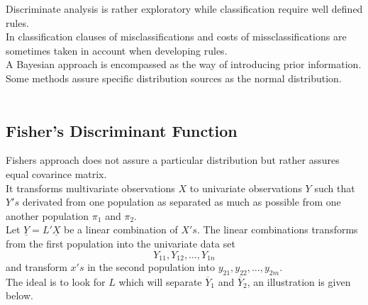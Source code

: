 \documentclass[11pt,a4paper]{article}
\theoremstyle{definition}
\begin{document}
Discriminate analysis is rather exploratory while classification require well defined rules.\\

In classification clauses of misclassifications and costs of missclassifications are sometimes taken in account when developing rules.\\
A Bayesian approach is encompassed as the way of introducing prior information.\\

Some methods assure specific distribution sources as the normal distribution.\\\\








\subsection{Fisher's Discriminant Function}
Fishers approach does not assure a particular distribution but rather assures equal covarince matrix.\\

It transforms multivariate observations $X$ to univariate observations $Y$ such that $Y's$ derivated from one population as separated as much as possible from one another population $\pi_1$ and $\pi_2$.\\

Let $\underline{Y}= L'\underline{X}$ be a linear combination of $X's$. The linear combinations transforms from the first population into the univariate data set $$Y_{11}, Y_{12}, \ldots, Y_{1n}$$ and transform $x's$ in the second population into $y_{21}, y_{22},\ldots, y_{2m}$.\\

The ideal is to look for $L$ which will separate $\overline{Y}_1$ and $\overline{Y}_2$, an illustration is given below.

\begin{figure}[H]
\centering
{}
\end{figure}
\end{document}
